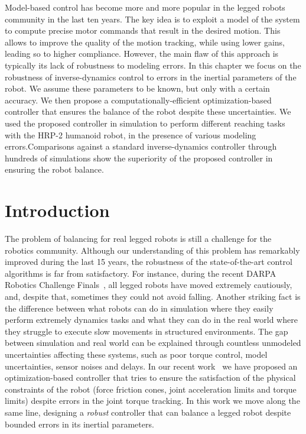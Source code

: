 
Model-based control has become more and more popular in the legged robots community in the last ten years. 
The key idea is to exploit a model of the system to compute precise motor commands that result in the desired motion.
This allows to improve the quality of the motion tracking, while using lower gains, leading so to higher compliance.
However, the main flaw of this approach is typically its lack of robustness to modeling errors. In this chapter we focus on the robustness of inverse-dynamics control to errors in the inertial parameters of the robot. We assume these parameters to be known, but only with a certain accuracy. We then propose a computationally-efficient optimization-based controller that ensures the balance of the robot despite these uncertainties. We used the proposed controller in simulation to perform different reaching tasks with the HRP-2 humanoid robot, in the presence of various modeling errors.Comparisons against a standard inverse-dynamics controller through hundreds of simulations show the superiority of the proposed controller in ensuring the robot balance.
\section{Introduction}
The problem of balancing for real legged robots is still a challenge for the robotics community.
Although our understanding of this problem has remarkably improved during the last 15 years, the robustness of the state-of-the-art control algorithms is far from satisfactory.
For instance, during the recent DARPA Robotics Challenge Finals~\cite{Pratt2015}, all legged robots have moved extremely cautiously, and, despite that, sometimes they could not avoid falling.
Another striking fact is the difference between what robots can do in simulation where they easily perform extremely dynamics tasks and what they can do in the real world where they struggle to execute slow movements in structured environments.
The gap between simulation and real world can be explained through countless unmodeled uncertainties affecting these systems, such as poor torque control, model uncertainties, sensor noises and delays.
In our recent work~\cite{DelPrete2015b} we have proposed an optimization-based controller that tries to ensure the satisfaction of the physical constraints of the robot (force friction cones, joint acceleration limits and torque limits) despite errors in the joint torque tracking. In this work we move along the same line, designing a \emph{robust} controller that can balance a legged robot despite bounded errors in its inertial parameters.




